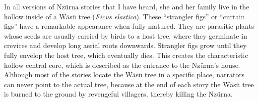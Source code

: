 In all versions of Nzürna stories that I have heard, she and her family live in the hollow inside of a Wäsü tree (\textit{Ficus elastica}). These ``strangler figs'' or ``curtain figs'' have a remarkable appearance when fully matured. They are parasitic plants whose seeds are usually carried by birds to a host tree, where they germinate in crevices and develop long aerial roots downwards. Strangler figs grow until they fully envelop the host tree, which eventually dies. This creates the characteristic hollow central core, which is described as the entrance to the Nzürna's house. Although most of the stories locate the Wäsü tree in a specific place, narrators can never point to the actual tree, because at the end of each story the Wäsü tree is burned to the ground by revengeful villagers, thereby killing the Nzürna.